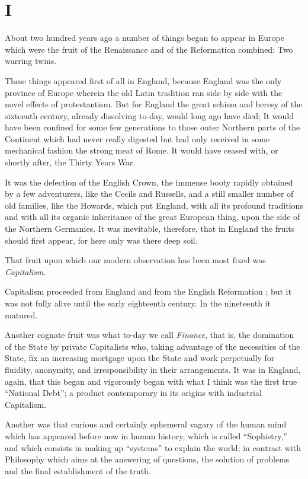 \documentclass{book}
\begin{document}
\chapter*{I}
\label{chapter-2}
About two hundred years ago a number of things began to appear in Europe which were the fruit of the Renaissance and of the Reformation combined: Two warring twins.

These things appeared first of all in England, because England was the only province of Europe wherein the old Latin tradition ran side by side with the novel effects of protestantism. But for England the great schism and heresy of the sixteenth century, already dissolving to-day, would long ago have died; It would have been confined for some few generations to those outer Northern parts of the Continent which had never really digested but had only received in some mechanical fashion the strong meat of Rome. It would have ceased with, or shortly after, the Thirty Years War.

It was the defection of the English Crown, the immense booty rapidly obtained by a few adventurers, like the Cecils and Russells, and a still smaller number of old families, like the Howards, which put England, with all its profound traditions and with all its organic inheritance of the great European thing, upon the side of the Northern Germanies. It was inevitable, therefore, that in England the fruits should first appear, for here only was there deep soil.

That fruit upon which our modern observation has been most fixed was \emph{Capitalism.}

Capitalism proceeded from England and from the English Reformation ; but it was not fully alive until the early eighteenth century. In the nineteenth it matured.

Another cognate fruit was what to-day we call \emph{Finance}, that is, the domination of the State by private Capitalists who, taking advantage of the necessities of the State, fix an increasing mortgage upon the State and work perpetually for fluidity, anonymity, and irresponsibility in their arrangements. It was in England, again, that this began and vigorously began with what I think was the first true “National Debt”; a product contemporary in its origins with industrial Capitalism.

Another was that curious and certainly ephemeral vagary of the human mind which has appeared before now in human history, which is called “Sophistry,” and which consists in making up “systems” to explain the world; in contrast with Philosophy which aims at the answering of questions, the solution of problems and the final establishment of the truth.
\end{document}
